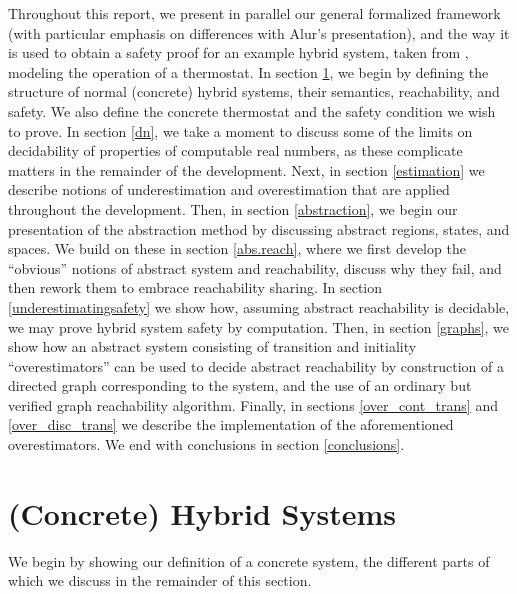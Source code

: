\documentclass[runningheads]{llncs}
\begin{document}
Throughout this report, we present in parallel our general formalized framework (with particular emphasis on differences with Alur's presentation), and the way it is used to obtain a safety proof for an example hybrid system, taken from \cite{alur}, modeling the operation of a thermostat. In section \ref{concrete}, we begin by defining the structure of normal (concrete) hybrid systems, their semantics, reachability, and safety. We also define the concrete thermostat and the safety condition we wish to prove. In section \ref{dn}, we take a moment to discuss some of the limits on decidability of properties of computable real numbers, as these complicate matters in the remainder of the development. Next, in section \ref{estimation} we describe notions of underestimation and overestimation that are applied throughout the development. Then, in section \ref{abstraction}, we begin our presentation of the abstraction method by discussing abstract regions, states, and spaces. We build on these in section \ref{abs.reach}, where we first develop the ``obvious'' notions of abstract system and reachability, discuss why they fail, and then rework them to embrace reachability sharing. In section \ref{underestimatingsafety} we show how, assuming abstract reachability is decidable, we may prove hybrid system safety by computation. Then, in section \ref{graphs}, we show how an abstract system consisting of transition and initiality ``overestimators'' can be used to decide abstract reachability by construction of a directed graph corresponding to the system, and the use of an ordinary but verified graph reachability algorithm. Finally, in sections \ref{over_cont_trans} and \ref{over_disc_trans} we describe the implementation of the aforementioned overestimators. We end with conclusions in section \ref{conclusions}.


\section{(Concrete) Hybrid Systems}
\label{concrete}

We begin by showing our definition of a concrete system, the different parts of which we discuss in the remainder of this section.
\end{document}
